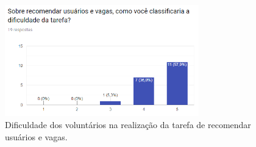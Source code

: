 \begin{figure}[H]
    \caption{Dificuldade dos voluntários na realização da tarefa de recomendar usuários e vagas.}
       	\begin{center}
            \includegraphics[width=0.75\textwidth]{figuras/avaliacao/pdv-6.png}
        \end{center}
    \label{avalGrafTURecomendar}
\end{figure}